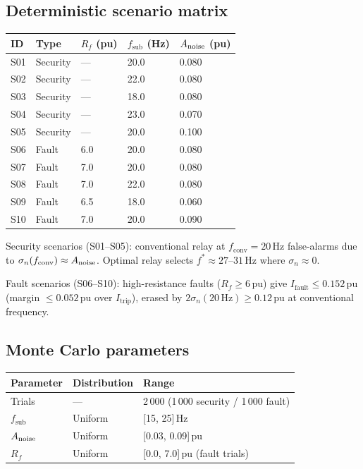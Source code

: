 \documentclass[11pt,a4paper]{article}
\newcommand{\Ifault}{I_{\mathrm{fault}}}
\newcommand{\Itrip}{I_{\mathrm{trip}}}
\newcommand{\sigman}{\sigma_n}
\newcommand{\fopt}{f^*}
\newcommand{\fsub}{f_{\mathrm{sub}}}
\newcommand{\fconv}{f_{\mathrm{conv}}}
\begin{document}
\subsection{Deterministic scenario matrix}

\begin{center}
\begin{tabular}{lllll}
  \toprule
  ID & Type & $R_f$ (pu) & $\fsub$ (Hz) & $A_{\rm noise}$ (pu) \\
  \midrule
  S01 & Security & — & 20.0 & 0.080 \\
  S02 & Security & — & 22.0 & 0.080 \\
  S03 & Security & — & 18.0 & 0.080 \\
  S04 & Security & — & 23.0 & 0.070 \\
  S05 & Security & — & 20.0 & 0.100 \\
  S06 & Fault & 6.0 & 20.0 & 0.080 \\
  S07 & Fault & 7.0 & 20.0 & 0.080 \\
  S08 & Fault & 7.0 & 22.0 & 0.080 \\
  S09 & Fault & 6.5 & 18.0 & 0.060 \\
  S10 & Fault & 7.0 & 20.0 & 0.090 \\
  \bottomrule
\end{tabular}
\end{center}

Security scenarios (S01--S05): conventional relay at $\fconv=20$\,Hz false-alarms
due to $\sigman(\fconv) \approx A_{\rm noise}$.  Optimal relay selects
$\fopt \approx 27$--$31$\,Hz where $\sigman \approx 0$.

Fault scenarios (S06--S10): high-resistance faults ($R_f \geq 6$\,pu) give
$\Ifault \leq 0.152$\,pu (margin $\leq 0.052$\,pu over $\Itrip$), erased by
$2\sigman(20\,\mathrm{Hz}) \geq 0.12$\,pu at conventional frequency.

\subsection{Monte Carlo parameters}

\begin{center}
\begin{tabular}{lll}
  \toprule
  Parameter & Distribution & Range \\
  \midrule
  Trials & — & 2\,000 (1\,000 security / 1\,000 fault) \\
  $\fsub$ & Uniform & [15, 25]\,Hz \\
  $A_{\rm noise}$ & Uniform & [0.03, 0.09]\,pu \\
  $R_f$ & Uniform & [0.0, 7.0]\,pu (fault trials) \\
  \bottomrule
\end{tabular}
\end{center}
\end{document}
